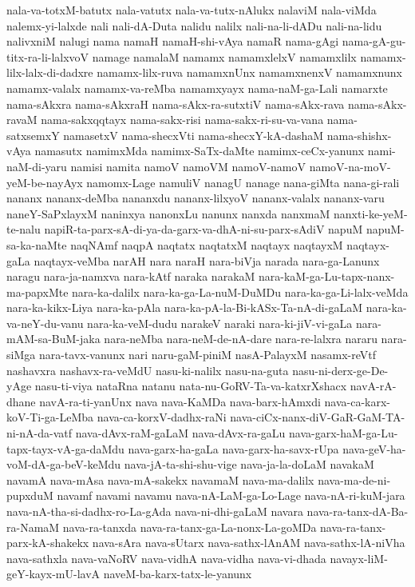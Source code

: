 {nala-va-totxM-batutx
nala-vatutx
nala-va-tutx-nAlukx
nalaviM
nala-viMda
nalemx-yi-lalxde
nali
nali-dA-Duta
nalidu
nalilx
nali-na-li-dADu
nali-na-lidu
nalivxniM
nalugi
nama
namaH
namaH-shi-vAya
namaR
nama-gAgi
nama-gA-gu-titx-ra-li-lalxvoV
namage
namalaM
namamx
namamxlelxV
namamxlilx
namamx-lilx-lalx-di-dadxre
namamx-lilx-ruva
namamxnUnx
namamxnenxV
namamxnunx
namamx-valalx
namamx-va-reMba
namamxyayx
nama-naM-ga-Lali
namarxte
nama-sAkxra
nama-sAkxraH
nama-sAkx-ra-sutxtiV
nama-sAkx-rava
nama-sAkx-ravaM
nama-sakxqqtayx
nama-sakx-risi
nama-sakx-ri-su-va-vana
nama-satxsemxY
namasetxV
nama-shecxVti
nama-shecxY-kA-dashaM
nama-shishx-vAya
namasutx
namimxMda
namimx-SaTx-daMte
namimx-ceCx-yanunx
nami-naM-di-yaru
namisi
namita
namoV
namoVM
namoV-namoV
namoV-na-moV-yeM-be-nayAyx
namomx-Lage
namuliV
nanagU
nanage
nana-giMta
nana-gi-rali
nananx
nananx-deMba
nananxdu
nananx-lilxyoV
nananx-valalx
nananx-varu
naneY-SaPxlayxM
naninxya
nanonxLu
nanunx
nanxda
nanxmaM
nanxti-ke-yeM-te-nalu
napiR-ta-parx-sA-di-ya-da-garx-va-dhA-ni-su-parx-sAdiV
napuM
napuM-sa-ka-naMte
naqNAmf
naqpA
naqtatx
naqtatxM
naqtayx
naqtayxM
naqtayx-gaLa
naqtayx-veMba
narAH
nara
naraH
nara-biVja
narada
nara-ga-Lanunx
naragu
nara-ja-namxva
nara-kAtf
naraka
narakaM
nara-kaM-ga-Lu-tapx-nanx-ma-papxMte
nara-ka-dalilx
nara-ka-ga-La-nuM-DuMDu
nara-ka-ga-Li-lalx-veMda
nara-ka-kikx-Liya
nara-ka-pAla
nara-ka-pA-la-Bi-kASx-Ta-nA-di-gaLaM
nara-ka-va-neY-du-vanu
nara-ka-veM-dudu
narakeV
naraki
nara-ki-jiV-vi-gaLa
nara-mAM-sa-BuM-jaka
nara-neMba
nara-neM-de-nA-dare
nara-re-lalxra
nararu
nara-siMga
nara-tavx-vanunx
nari
naru-gaM-piniM
nasA-PalayxM
nasamx-reVtf
nashavxra
nashavx-ra-veMdU
nasu-ki-nalilx
nasu-na-guta
nasu-ni-derx-ge-De-yAge
nasu-ti-viya
nataRna
natanu
nata-nu-GoRV-Ta-va-katxrXshacx
navA-rA-dhane
navA-ra-ti-yanUnx
nava
nava-KaMDa
nava-barx-hAmxdi
nava-ca-karx-koV-Ti-ga-LeMba
nava-ca-korxV-dadhx-raNi
nava-ciCx-nanx-diV-GaR-GaM-TA-ni-nA-da-vatf
nava-dAvx-raM-gaLaM
nava-dAvx-ra-gaLu
nava-garx-haM-ga-Lu-tapx-tayx-vA-ga-daMdu
nava-garx-ha-gaLa
nava-garx-ha-savx-rUpa
nava-geV-ha-voM-dA-ga-beV-keMdu
nava-jA-ta-shi-shu-vige
nava-ja-la-doLaM
navakaM
navamA
nava-mAsa
nava-mA-sakekx
navamaM
nava-ma-dalilx
nava-ma-de-ni-pupxduM
navamf
navami
navamu
nava-nA-LaM-ga-Lo-Lage
nava-nA-ri-kuM-jara
nava-nA-tha-si-dadhx-ro-La-gAda
nava-ni-dhi-gaLaM
navara
nava-ra-tanx-dA-Ba-ra-NamaM
nava-ra-tanxda
nava-ra-tanx-ga-La-nonx-La-goMDa
nava-ra-tanx-parx-kA-shakekx
nava-sAra
nava-sUtarx
nava-sathx-lAnAM
nava-sathx-lA-niVha
nava-sathxla
nava-vaNoRV
nava-vidhA
nava-vidha
nava-vi-dhada
navayx-liM-geY-kayx-mU-lavA
naveM-ba-karx-tatx-le-yanunx
}
